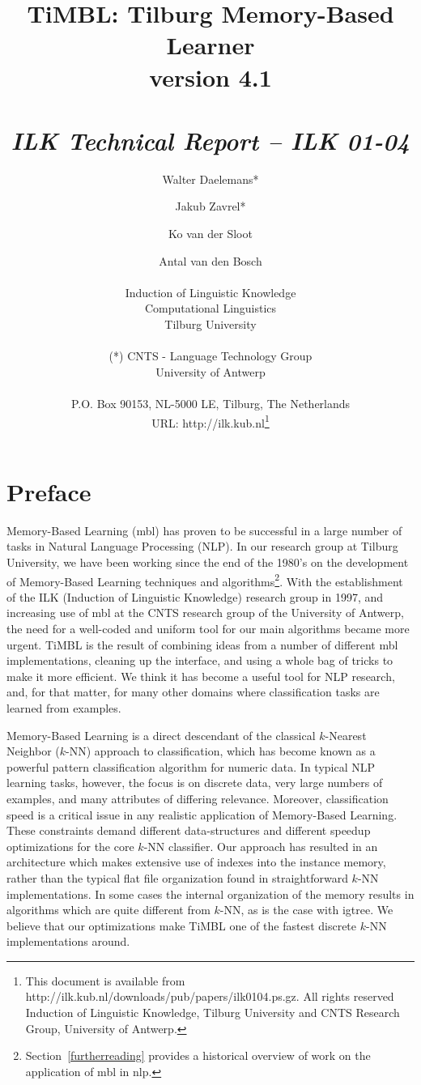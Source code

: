 \documentclass{report}
\author{Walter Daelemans* \and Jakub Zavrel* \and Ko van der Sloot \and
	Antal van den Bosch\\ \ \\
	Induction of Linguistic Knowledge\\
	Computational Linguistics\\ 
        Tilburg University \\ \\
	(*) CNTS - Language Technology Group\\
	University of Antwerp\\ \\
        P.O. Box 90153, NL-5000 LE, Tilburg, The Netherlands \\ 
        URL: http://ilk.kub.nl\thanks{This document is available from
	http://ilk.kub.nl/downloads/pub/papers/ilk0104.ps.gz. All rights reserved
	Induction of Linguistic Knowledge, Tilburg University and 
        CNTS Research Group, University of Antwerp.}}
\title{{\huge TiMBL: Tilburg Memory-Based Learner} \\ \vspace*{0.5cm}
{\bf version 4.1} \\ \vspace*{0.5cm}{\huge Reference Guide}\\
\vspace*{1cm} {\it ILK Technical Report -- ILK 01-04}}
\begin{document}

\maketitle

\tableofcontents

\chapter*{Preface}

Memory-Based Learning ({\sc mbl}) has proven to be successful in a
large number of tasks in Natural Language Processing (NLP). In our
research group at Tilburg University, we have been working since the
end of the 1980's on the development of Memory-Based Learning
techniques and algorithms\footnote{Section~\ref{furtherreading}
provides a historical overview of work on the application of {\sc
mbl} in {\sc nlp}.}. With the establishment of the ILK (Induction of
Linguistic Knowledge) research group in 1997, and increasing use of
{\sc mbl} at the CNTS research group of the University of Antwerp, the
need for a well-coded and uniform tool for our main algorithms became
more urgent. TiMBL is the result of combining ideas from a number of
different {\sc mbl} implementations, cleaning up the interface, and
using a whole bag of tricks to make it more efficient. We think it has
become a useful tool for NLP research, and, for that matter, for many
other domains where classification tasks are learned from examples.

Memory-Based Learning is a direct descendant of the classical
$k$-Nearest Neighbor ($k$-NN) approach to classification, which has
become known as a powerful pattern classification algorithm for
numeric data. In typical NLP learning tasks, however, the focus is on
discrete data, very large numbers of examples, and many attributes of
differing relevance. Moreover, classification speed is a critical
issue in any realistic application of Memory-Based Learning. These
constraints demand different data-structures and different speedup
optimizations for the core $k$-NN classifier. Our approach has
resulted in an architecture which makes extensive use of indexes into
the instance memory, rather than the typical flat file organization
found in straightforward $k$-NN implementations. In some cases the
internal organization of the memory results in algorithms which are
quite different from $k$-NN, as is the case with {\sc igtree}. We
believe that our optimizations make TiMBL one of the fastest discrete
$k$-NN implementations around.
\end{document}

